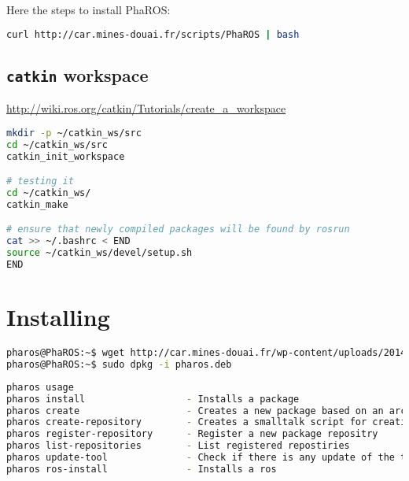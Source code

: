\documentclass[a4paper,10pt,twoside]{book}
\begin{document}
Here the steps to install PhaROS:

\begin{lstlisting}[language=bash]	
curl http://car.mines-douai.fr/scripts/PhaROS | bash
\end{lstlisting}
	

\subsection{\texttt{catkin} workspace}

\url{http://wiki.ros.org/catkin/Tutorials/create_a_workspace}
	
\begin{lstlisting}[language=bash,title={\installationTool{} help output}]
mkdir -p ~/catkin_ws/src
cd ~/catkin_ws/src
catkin_init_workspace

# testing it
cd ~/catkin_ws/
catkin_make

# ensure that newly compiled packages will be found by rosrun
cat >> ~/.bashrc < END
source ~/catkin_ws/devel/setup.sh
END
\end{lstlisting}


\section{Installing \installationTool{}}

\begin{lstlisting}[language=bash,title={Installing \installationTool{}}]
pharos@PhaROS:~$ wget http://car.mines-douai.fr/wp-content/uploads/2014/01/pharos.deb .
pharos@PhaROS:~$ sudo dpkg -i pharos.deb
\end{lstlisting}


\begin{lstlisting}[language=bash,title={\installationTool{} help output}]
pharos usage
pharos install					- Installs a package 
pharos create 					- Creates a new package based on an archetype
pharos create-repository		- Creates a smalltalk script for creating your own repository
pharos register-repository		- Register a new package repositry
pharos list-repositories		- List registered repostiries
pharos update-tool	      		- Check if there is any update of the tool, and it update it.
pharos ros-install				- Installs a ros
\end{lstlisting}


\end{document}
